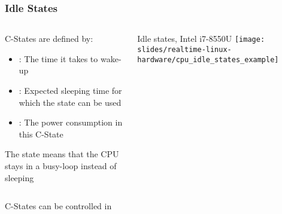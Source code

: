 \begin{frame}
        \frametitle{Idle States}
        \begin{columns}
                \begin{column}{0.7\textwidth}
                        C-States are defined by:
                        \begin{itemize}
                                \item {}: The time it takes to wake-up
                                \item {}: Expected sleeping time for which the state can be used
                                \item {}: The power consumption in this C-State
                        \end{itemize}
                        The  state means that the CPU stays in a busy-loop instead of sleeping
                \end{column}
                \begin{column}{0.3\textwidth}
                        Idle states, Intel i7-8550U
                    \texttt{[image: slides/realtime-linux-hardware/cpu\_idle\_states\_example]}
                \end{column}
        \end{columns}
        \vspace{0.5cm}
C-States can be controlled in 
\end{frame}

